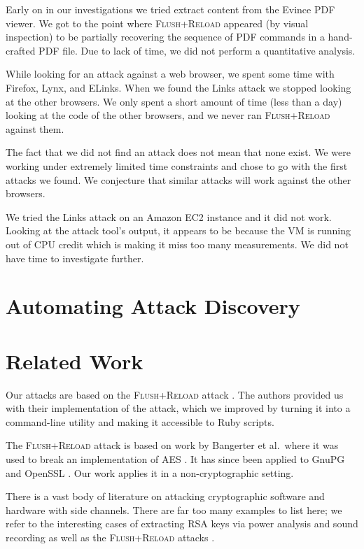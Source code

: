 \documentclass[letterpaper,twocolumn,10pt]{article}
\begin{document}
Early on in our investigations we tried extract content from the Evince PDF
viewer. We got to the point where \textsc{Flush+Reload} appeared (by visual
inspection) to be partially recovering the sequence of PDF commands in
a hand-crafted PDF file. Due to lack of time, we did not perform a quantitative
analysis. 

While looking for an attack against a web browser, we spent some time with
Firefox, Lynx, and ELinks. When we found the Links attack we stopped looking at
the other browsers. We only spent a short amount of time (less than a day)
looking at the code of the other browsers, and we never ran \textsc{Flush+Reload} against
them.

The fact that we did not find an attack does not mean that none exist. We were
working under extremely limited time constraints and chose to go with the first
attacks we found. We conjecture that similar attacks will work against the other
browsers.

We tried the Links attack on an Amazon EC2 instance and it did not work. Looking
at the attack tool's output, it appears to be because the VM is running out of
CPU credit which is making it miss too many measurements. We did not have time
to investigate further.

\section{Automating Attack Discovery}

\section{Related Work}
\label{sec:relwork}

Our attacks are based on the \textsc{Flush+Reload} attack \cite{yarom2013flush}.
The authors provided us with their implementation of the attack, which we
improved by turning it into a command-line utility and making it accessible to
Ruby scripts.

The \textsc{Flush+Reload} attack is based on work by Bangerter et al.\ where it was used
to break an implementation of AES \cite{gullasch2011cache}. It has since been
applied to GnuPG \cite{yarom2013flush} and OpenSSL \cite{benger2014ooh,
yarom2014recovering}. Our work applies it in a non-cryptographic setting.

There is a vast body of literature on attacking cryptographic software and
hardware with side channels. There are far too many examples to list here; we
refer to the interesting cases of extracting RSA keys via power analysis
\cite{messerges1999power} and sound recording \cite{genkin2013rsa} as well as
the \textsc{Flush+Reload} attacks \cite{yarom2013flush, benger2014ooh,
yarom2014recovering}.
\end{document}
